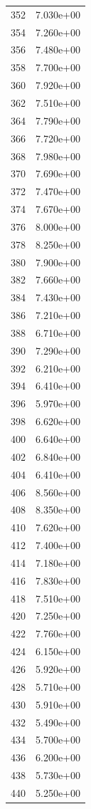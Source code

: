 \documentclass[12pt]{article}
\begin{document}
\begin{longtable}{@{}cc@{}}
352 & 7.030e+00 \\
354 & 7.260e+00 \\
356 & 7.480e+00 \\
358 & 7.700e+00 \\
360 & 7.920e+00 \\
362 & 7.510e+00 \\
364 & 7.790e+00 \\
366 & 7.720e+00 \\
368 & 7.980e+00 \\
370 & 7.690e+00 \\
372 & 7.470e+00 \\
374 & 7.670e+00 \\
376 & 8.000e+00 \\
378 & 8.250e+00 \\
380 & 7.900e+00 \\
382 & 7.660e+00 \\
384 & 7.430e+00 \\
386 & 7.210e+00 \\
388 & 6.710e+00 \\
390 & 7.290e+00 \\
392 & 6.210e+00 \\
394 & 6.410e+00 \\
396 & 5.970e+00 \\
398 & 6.620e+00 \\
400 & 6.640e+00 \\
402 & 6.840e+00 \\
404 & 6.410e+00 \\
406 & 8.560e+00 \\
408 & 8.350e+00 \\
410 & 7.620e+00 \\
412 & 7.400e+00 \\
414 & 7.180e+00 \\
416 & 7.830e+00 \\
418 & 7.510e+00 \\
420 & 7.250e+00 \\
422 & 7.760e+00 \\
424 & 6.150e+00 \\
426 & 5.920e+00 \\
428 & 5.710e+00 \\
430 & 5.910e+00 \\
432 & 5.490e+00 \\
434 & 5.700e+00 \\
436 & 6.200e+00 \\
438 & 5.730e+00 \\
440 & 5.250e+00 \\

\end{longtable}
\end{document}
